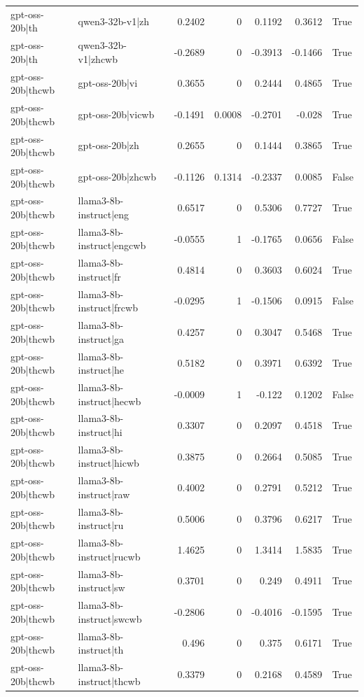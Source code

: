 \begin{table}
\begin{tabular}{l l r r r r l}
gpt-oss-20b|th & qwen3-32b-v1|zh & 0.2402 & 0 & 0.1192 & 0.3612 & True \\
gpt-oss-20b|th & qwen3-32b-v1|zhcwb & -0.2689 & 0 & -0.3913 & -0.1466 & True \\
gpt-oss-20b|thcwb & gpt-oss-20b|vi & 0.3655 & 0 & 0.2444 & 0.4865 & True \\
gpt-oss-20b|thcwb & gpt-oss-20b|vicwb & -0.1491 & 0.0008 & -0.2701 & -0.028 & True \\
gpt-oss-20b|thcwb & gpt-oss-20b|zh & 0.2655 & 0 & 0.1444 & 0.3865 & True \\
gpt-oss-20b|thcwb & gpt-oss-20b|zhcwb & -0.1126 & 0.1314 & -0.2337 & 0.0085 & False \\
gpt-oss-20b|thcwb & llama3-8b-instruct|eng & 0.6517 & 0 & 0.5306 & 0.7727 & True \\
gpt-oss-20b|thcwb & llama3-8b-instruct|engcwb & -0.0555 & 1 & -0.1765 & 0.0656 & False \\
gpt-oss-20b|thcwb & llama3-8b-instruct|fr & 0.4814 & 0 & 0.3603 & 0.6024 & True \\
gpt-oss-20b|thcwb & llama3-8b-instruct|frcwb & -0.0295 & 1 & -0.1506 & 0.0915 & False \\
gpt-oss-20b|thcwb & llama3-8b-instruct|ga & 0.4257 & 0 & 0.3047 & 0.5468 & True \\
gpt-oss-20b|thcwb & llama3-8b-instruct|he & 0.5182 & 0 & 0.3971 & 0.6392 & True \\
gpt-oss-20b|thcwb & llama3-8b-instruct|hecwb & -0.0009 & 1 & -0.122 & 0.1202 & False \\
gpt-oss-20b|thcwb & llama3-8b-instruct|hi & 0.3307 & 0 & 0.2097 & 0.4518 & True \\
gpt-oss-20b|thcwb & llama3-8b-instruct|hicwb & 0.3875 & 0 & 0.2664 & 0.5085 & True \\
gpt-oss-20b|thcwb & llama3-8b-instruct|raw & 0.4002 & 0 & 0.2791 & 0.5212 & True \\
gpt-oss-20b|thcwb & llama3-8b-instruct|ru & 0.5006 & 0 & 0.3796 & 0.6217 & True \\
gpt-oss-20b|thcwb & llama3-8b-instruct|rucwb & 1.4625 & 0 & 1.3414 & 1.5835 & True \\
gpt-oss-20b|thcwb & llama3-8b-instruct|sw & 0.3701 & 0 & 0.249 & 0.4911 & True \\
gpt-oss-20b|thcwb & llama3-8b-instruct|swcwb & -0.2806 & 0 & -0.4016 & -0.1595 & True \\
gpt-oss-20b|thcwb & llama3-8b-instruct|th & 0.496 & 0 & 0.375 & 0.6171 & True \\
gpt-oss-20b|thcwb & llama3-8b-instruct|thcwb & 0.3379 & 0 & 0.2168 & 0.4589 & True \\

\end{tabular}
\end{table}
